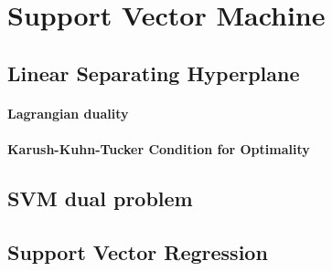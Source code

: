 \section{Support Vector Machine}

	\subsection{Linear Separating Hyperplane}

		\paragraph*{Lagrangian duality}
		\paragraph*{Karush-Kuhn-Tucker Condition for Optimality}
	\subsection{SVM dual problem}

	\subsection{Support Vector Regression}





